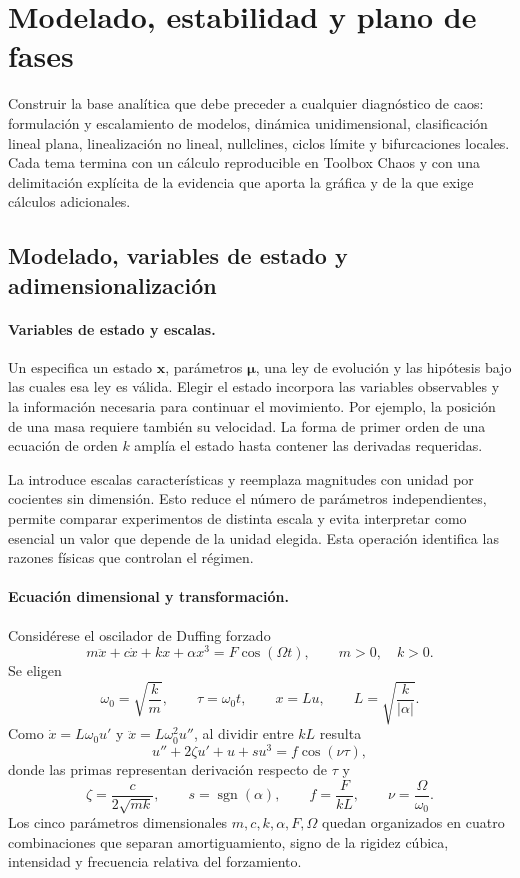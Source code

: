 
\section{Modelado, estabilidad y plano de fases}

\begin{objectivebox}
Construir la base analítica que debe preceder a cualquier diagnóstico de caos:
formulación y escalamiento de modelos, dinámica unidimensional, clasificación lineal
plana, linealización no lineal, nullclines, ciclos límite y bifurcaciones locales.
Cada tema termina con un cálculo reproducible en Toolbox Chaos y con una delimitación
explícita de la evidencia que aporta la gráfica y de la que exige cálculos adicionales.
\end{objectivebox}

\subsection{Modelado, variables de estado y adimensionalización}

\paragraph{Variables de estado y escalas.}
Un  especifica un estado \(\mathbf{x}\), parámetros
\(\boldsymbol\mu\), una ley de evolución y las hipótesis bajo las cuales esa ley es
válida. Elegir el estado incorpora las variables observables y la
información necesaria para continuar el movimiento. Por ejemplo, la posición de una
masa requiere también su velocidad. La forma de primer orden de una
ecuación de orden \(k\) amplía el estado hasta contener las derivadas requeridas.

La  introduce escalas características y reemplaza
magnitudes con unidad por cocientes sin dimensión. Esto reduce el número de
parámetros independientes, permite comparar experimentos de distinta escala y evita
interpretar como esencial un valor que depende de la unidad elegida. Esta
operación identifica las razones físicas que controlan el régimen.

\paragraph{Ecuación dimensional y transformación.}
Considérese el oscilador de Duffing forzado
\[
 m\ddot x+c\dot x+kx+\alpha x^3=F\cos(\Omega t),
 \qquad m>0,\quad k>0.
\]
Se eligen
\[
 \omega_0=\sqrt{\frac{k}{m}},\qquad
 \tau=\omega_0t,\qquad x=L u,\qquad
 L=\sqrt{\frac{k}{|\alpha|}}.
\]
Como \(\dot x=L\omega_0u'\) y
\(\ddot x=L\omega_0^2u''\), al dividir entre \(kL\) resulta
\[
 u''+2\zeta u'+u+s u^3=f\cos(\nu\tau),
\]
donde las primas representan derivación respecto de \(\tau\) y
\[
 \zeta=\frac{c}{2\sqrt{mk}},\qquad
 s=\operatorname{sgn}(\alpha),\qquad
 f=\frac{F}{kL},\qquad
 \nu=\frac{\Omega}{\omega_0}.
\]
Los cinco parámetros dimensionales \(m,c,k,\alpha,F,\Omega\) quedan organizados en
cuatro combinaciones que separan amortiguamiento, signo de la rigidez cúbica,
intensidad y frecuencia relativa del forzamiento.

